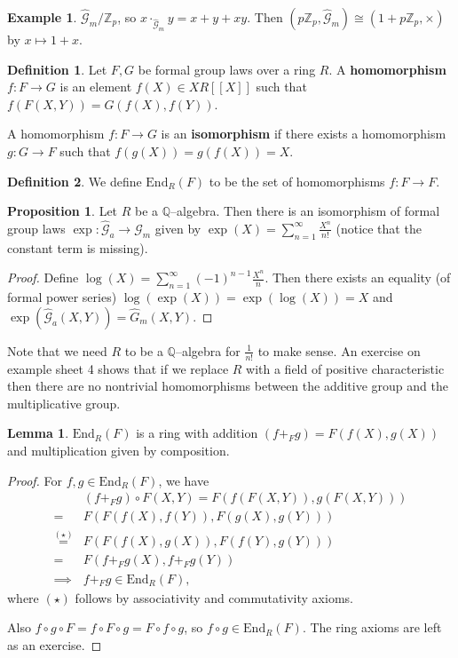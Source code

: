 \documentclass{article}
\theoremstyle{definition}
\newtheorem{lemma}[theorem]{Lemma}
\newtheorem{prop}[theorem]{Proposition}
\newtheorem{example}{Example}[section]
\newtheorem{defn}{Definition}[section]
\begin{document}
\begin{example}
    $\hat{\mathcal{G}}_m/\mathbb{Z}_p$, so $x \cdot_{\hat{\mathcal{G}}_m} y = x + y + xy$. Then $(p \mathbb{Z}_p, \hat{\mathcal{G}}_m) \cong (1 + p \mathbb{Z}_p, \times)$ by $x \mapsto 1 + x$.
\end{example}
\begin{defn}
    Let $F,G$ be formal group laws over a ring $R$. A \textbf{homomorphism} $f : F \to G$ is an element $f(X) \in XR[[X]]$ such that $f(F(X,Y))=G(f(X),f(Y))$.
    \vspace{1mm}
     
    A homomorphism $f : F \to G$ is an \textbf{isomorphism} if there exists a homomorphism $g : G \to F$ such that $f(g(X))=g(f(X))=X$.
\end{defn}
\begin{defn}
    We define $\text{End}_R(F)$ to be the set of homomorphisms $f: F \to F$.
\end{defn}
\begin{prop}
    Let $R$ be a $\mathbb{Q}$--algebra. Then there is an isomorphism of formal group laws $\exp : \hat{\mathcal{G}}_a \to \hat{\mathcal{G}}_m$ given by $\exp(X) = \sum_{n=1}^{\infty} \frac{X^n}{n!}$ (notice that the constant term is missing).
\end{prop}
\begin{proof}
    Define $\log(X) = \sum_{n=1}^{\infty} (-1)^{n-1}\frac{X^n}{n}$. Then there exists an equality (of formal power series) $\log(\exp(X))=\exp(\log(X))=X$ and $\exp(\hat{\mathcal{G}}_a(X,Y))=\hat{G}_m(X,Y)$. 
\end{proof}
Note that we need $R$ to be a $\mathbb{Q}$--algebra for $\frac{1}{n!}$ to make sense. An exercise on example sheet 4 shows that if we replace $R$ with a field of positive characteristic then there are no nontrivial homomorphisms between the additive group and the multiplicative group.
\begin{lemma}
    $\text{End}_R(F)$ is a ring with addition $(f +_{F} g) = F(f(X),g(X))$ and multiplication given by composition.
\end{lemma}
\begin{proof}
    For $f, g \in \text{End}_R(F)$, we have 
    \begin{align*}
        &(f +_F g) \circ F(X,Y) = F(f(F(X,Y)), g(F(X,Y))) \\
        =& F(F(f(X),f(Y)),F(g(X),g(Y)))\\
        \stackrel{(\star)}{=} & F(F(f(X),g(X)),F(f(Y),g(Y)))\\
        =& F(f +_F g(X), f +_F g(Y))\\
        \implies & f +_F g \in \text{End}_R(F),
    \end{align*}
    where $(\star)$ follows by associativity and commutativity axioms.
    \vspace{1mm}
     
    Also $f \circ g \circ F  = f \circ F \circ g = F \circ f \circ g$, so $f \circ g \in \text{End}_R(F)$. The ring axioms are left as an exercise.
\end{proof}
\end{document}
